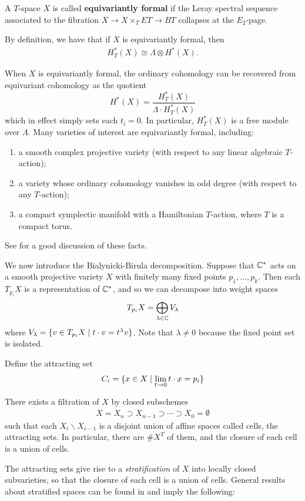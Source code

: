 \begin{definition}
	A $T$-space $X$ is called \textbf{equivariantly formal} if the Leray spectral sequence
	associated to the fibration $X \to X \times_T ET \to BT$ collapses at the $E_2$-page.
\end{definition}

By definition, we have that if $X$ is equivariantly formal, then \begin{align*}
	H^*_T(X) \cong \Lambda \otimes H^*(X).
\end{align*}


When $X$ is equivariantly formal, the ordinary cohomology can be recovered from equivariant cohomology as the quotient
\[
	H^*(X) = \frac{H^*_T(X)}{\Lambda \cdot H^*_T(X)}
\]
which in effect simply sets each $t_i = 0$. In particular, $H^*_T(X)$ is a free module over $\Lambda$. Many varieties of interest are equivariantly formal, including:
\begin{enumerate}
	\item a smooth complex projective variety (with respect to any linear algebraic $T$-action);
	\item a variety whose ordinary cohomology vanishes in odd degree (with respect to any $T$-action);
	\item a compact symplectic manifold with a Hamiltonian $T$-action, where $T$ is a compact torus.
\end{enumerate}
See \cite{fulton-anderson} for a good discussion of these facts.



We now introduce the Bialynicki-Birula decomposition. Suppose that $\mathbb{C}^*$ acts on a smooth projective variety $X$ with finitely many fixed points $p_1,\ldots,p_k$. Then each $T_{p_i}X$ is a representation of $\mathbb{C}^*$, and so we can decompose
into weight spaces \begin{align*}
	T_{p_i}X = \bigoplus_{\lambda\in \mathbb{C}} V_\lambda
\end{align*} where $V_\lambda = \{v\in T_{p_i}X \mid t\cdot v = t^\lambda v\}$. Note that $\lambda\neq 0 $ because the fixed point set is isolated.

Define the attracting set \begin{align*}
	C_i = \{x\in X \mid \lim_{t\to 0} t\cdot x = p_i\}
\end{align*}

\begin{theorem}
	There exists a filtration of $X$ by closed subschemes \begin{align*}
		X = X_n \supset X_{n-1} \supset \cdots \supset X_0 = \emptyset
	\end{align*} such that
	each $X_i \backslash X_{i-1}$ is a disjoint union of affine spaces called cells, the attracting sets. In particular, there are $\#X^T$ of them, and the closure of each cell is a union of cells.
\end{theorem}
The attracting sets give rise to a \emph{stratification} of $X$ into locally closed
subvarieties, so that the closure of each cell is a union of cells. General results
about stratified spaces can be found in \cite{eisenbud-harris} and imply the following:

